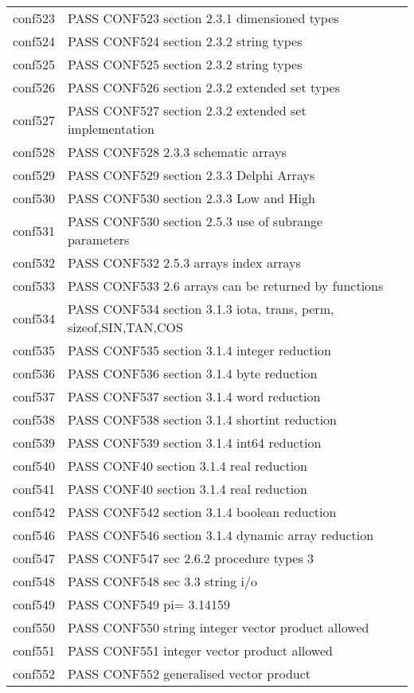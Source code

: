 \begin{tabular}{llc}
  conf523&PASS CONF523 section 2.3.1 dimensioned types&\\
  conf524&PASS CONF524 section 2.3.2 string types&\\
  conf525&PASS CONF525 section 2.3.2 string types&\\
  conf526&PASS CONF526 section 2.3.2 extended set types&\\
  conf527&PASS CONF527 section 2.3.2 extended set implementation&\\
  conf528&PASS CONF528 2.3.3 schematic arrays&\\
  conf529&PASS CONF529 section 2.3.3 Delphi Arrays&\\
  conf530&PASS CONF530 section 2.3.3 Low and High&\\
  conf531&PASS CONF530 section 2.5.3 use of subrange parameters&\\
  conf532&PASS CONF532 2.5.3 arrays index arrays&\\
  conf533&PASS CONF533 2.6 arrays can be returned by functions&\\
  conf534&PASS CONF534 section 3.1.3 iota,  trans, perm, sizeof,SIN,TAN,COS &\\
  conf535&PASS CONF535 section 3.1.4 integer reduction&\\
  conf536&PASS CONF536 section 3.1.4 byte reduction&\\
  conf537&PASS CONF537 section 3.1.4 word reduction&\\
  conf538&PASS CONF538 section 3.1.4 shortint reduction&\\
  conf539&PASS CONF539 section 3.1.4 int64 reduction&\\
  conf540&PASS CONF40 section 3.1.4 real reduction&\\
  conf541&PASS CONF40 section 3.1.4 real reduction&\\
  conf542&PASS CONF542 section 3.1.4 boolean reduction&\\
  conf546&PASS CONF546 section 3.1.4 dynamic array reduction&\\
  conf547&PASS CONF547 sec 2.6.2 procedure types           3&\\
  conf548&PASS CONF548 sec 3.3 string i/o&\\
  conf549&PASS CONF549 pi=     3.14159&\\
  conf550&PASS CONF550 string integer vector product allowed&\\
  conf551&PASS CONF551  integer vector product allowed&\\
  conf552&PASS CONF552  generalised vector product&\\

\end{tabular}
